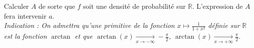 \documentclass[a4paper,12pt]{article}
\begin{document}
Calculer $A$ de sorte que $f$ soit une densité de probabilité sur $\mathbb{R}$. L'expression de $A$ fera intervenir $a$. \\
\textit{Indication : On admettra qu'une primitive de la fonction $x \mapsto \frac{1}{1+x^2}$ définie sur $\mathbb{R}$ est la fonction $\arctan$ et que $\arctan(x) \xrightarrow[x \to -\infty]{} -\frac{\pi}{2}$, $\arctan(x) \xrightarrow[x \to +\infty]{} \frac{\pi}{2}$}.
\end{document}
